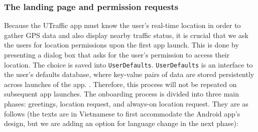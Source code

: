 \subsubsection{The landing page and permission requests}
Because the UTraffic app must know the user's real-time location in order to gather GPS data and also display nearby traffic status, it is crucial that we ask the users for location permissions upon the first app launch. This is done by presenting a dialog box that asks for the user's permission to access their location. The choice is saved into \lstinline{UserDefaults}. \lstinline{UserDefaults} is an interface to the user's defaults database, where key-value pairs of data are stored persistently across launches of the app. \cite{a2019_userdefaults}. Therefore, this process will not be repeated on subsequent app launches. The onboarding process is divided into three main phases: greetings, location request, and always-on location request. They are as follows (the texts are in Vietnamese to first accommodate the Android app's design, but we are adding an option for language change in the next phase):
